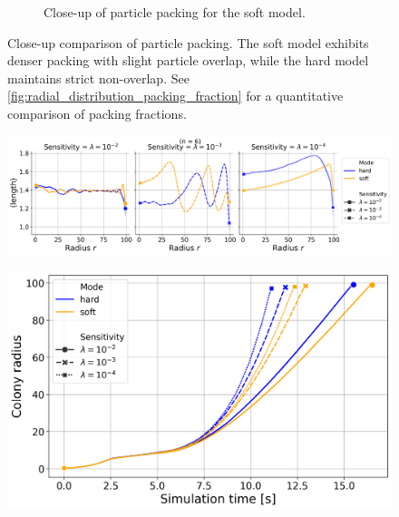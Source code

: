 \documentclass[conference]{IEEEtran}
\begin{document}
\begin{figure}[H]
\begin{subfigure}[b]{0.49\columnwidth}
        \caption{Close-up of particle packing for the soft model.}
        \label{fig:packing_soft}
    \end{subfigure}
    \caption{Close-up comparison of particle packing. The soft model exhibits denser packing with slight particle overlap, while the hard model maintains strict non-overlap. See \autoref{fig:radial_distribution_packing_fraction} for a quantitative comparison of packing fractions.}
    \label{fig:dense_packing_comparison}
\end{figure}


\begin{figure}[h]
    \centering
    \includegraphics[width=\linewidth]{figures/comparison_plots/combined_length_shared.png}

    \caption{ }
\end{figure}


\begin{figure}[h]
    \centering
    \includegraphics[width=\linewidth]{figures/comparison_plots/combined_simulation_time [s]_vs_colony_radius.png}
    \caption{ }
\end{figure}
\end{document}
